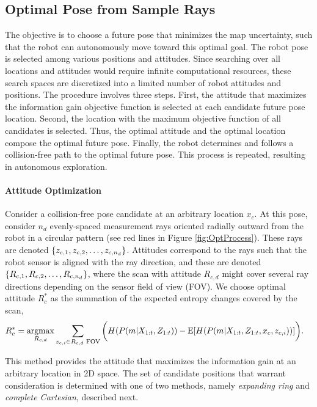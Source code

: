 \subsection{Optimal Pose from Sample Rays}
\label{sec:OptimalPose2DMap}

The objective is to choose a future pose that minimizes the map uncertainty, such that the robot can autonomously move toward this optimal goal. The robot pose is selected among various positions and attitudes. Since searching over all locations and attitudes would require infinite computational resources, these search spaces are discretized into a limited number of robot attitudes and positions.
The procedure involves three steps. First, the attitude that maximizes the information gain objective function is selected at each candidate future pose location. Second, the location with the maximum objective function of all candidates is selected. Thus, the optimal attitude and the optimal location compose the optimal future pose. Finally, the robot determines and follows a collision-free path to the optimal future pose. This process is repeated, resulting in autonomous exploration.

\paragraph{Attitude Optimization}
Consider a collision-free pose candidate at an arbitrary location $x_c$. At this pose, consider $n_d$ evenly-spaced measurement rays oriented radially outward from the robot in a circular pattern (see red lines in Figure \ref{fig:OptProcess}). These rays are denoted $\left\{ z_{c,1},z_{c,2},\ldots,z_{c,n_d} \right\}$. Attitudes correspond to the rays such that the robot sensor is aligned with the ray direction, and these are denoted $\left\{ R_{c,1},R_{c,2},\ldots,R_{c,n_d} \right\}$, where the scan with attitude $R_{c,d}$ might cover several ray directions depending on the sensor field of view (FOV). We choose optimal attitude $R_c^*$ as the summation of the expected entropy changes covered by the scan,
\begin{align}
\label{eqn:FindRc}
&R_c^*=\argmax_{R_{c,d}}\sum_{z_{c,i}\in R_{c,d}\text{ FOV}}\bigg(H(P(m|X_{1:t},Z_{1:t}))
-\text{E}[H(P(m|X_{1:t},Z_{1:t},x_c,z_{c,i}))]\bigg).
\end{align}

This method provides the attitude that maximizes the information gain at an arbitrary location in 2D space. The set of candidate positions that warrant consideration is determined with one of two methods, namely \emph{expanding ring} and \emph{complete Cartesian}, described next.

